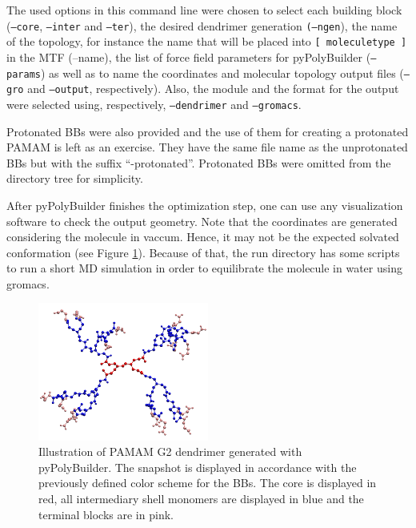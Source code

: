 The used options in this command line were chosen to select each building block (\texttt{--core}, \texttt{--inter} and \texttt{--ter}), the desired dendrimer generation \texttt{(--ngen}), the name of the topology, for instance the name that will be placed into \texttt{[ moleculetype ]} in the MTF 
(--name), the list of force field parameters for pyPolyBuilder (\texttt{--params}) as well as to name the coordinates and molecular topology output files (\texttt{--gro} and \texttt{--output}, respectively).
Also, the module and the format for the output were selected using, respectively, \texttt{--dendrimer} and \texttt{--gromacs}.

Protonated BBs were also provided and the use of them for creating a protonated PAMAM is left as an exercise.
They have the same file name as the unprotonated BBs but with the suffix ``-protonated''.
Protonated BBs were omitted from the directory tree for simplicity.

After pyPolyBuilder finishes the optimization step, one can use any visualization software to check the output geometry. 
Note that the coordinates are generated considering the molecule in vaccum.
Hence, it may not be the expected solvated conformation (see Figure \ref{fig:PAMAMG2PPB}).
Because of that, the run directory has some scripts to run a short MD simulation in order to equilibrate the molecule in water using gromacs.

\begin{figure}
    \centering
    \includegraphics[width=0.5\textwidth]{PAMAM/PAMAM.pdf}
    \caption{Illustration of PAMAM G2 dendrimer generated with pyPolyBuilder.
    The snapshot is displayed in accordance with the previously defined color scheme for the BBs. The core is displayed in red, all intermediary shell monomers are displayed in blue and the terminal blocks are in pink.}
    \label{fig:PAMAMG2PPB}
\end{figure}

